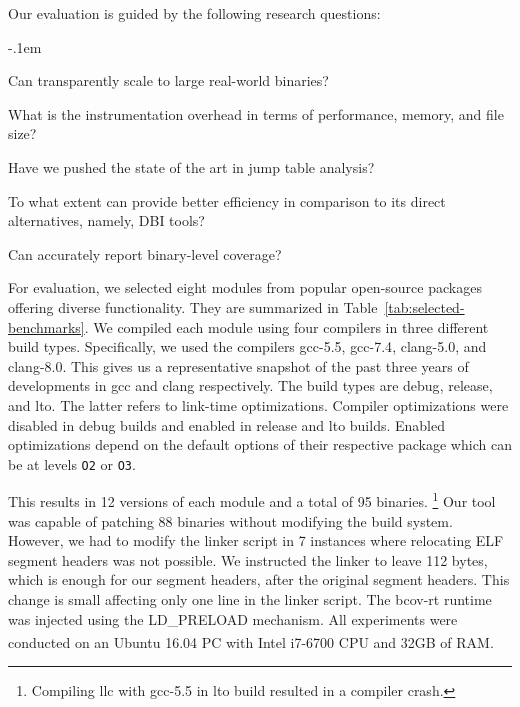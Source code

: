 Our evaluation is guided by the following research questions:

\begin{description}
    \itemsep-.1em
    \item[RQ1] Can {\bcov} transparently scale to large real-world binaries?
    \item[RQ2] What is the instrumentation overhead in terms of performance, memory, and file size?        
    \item[RQ3] Have we pushed the state of the art in jump table analysis?    
    \item[RQ4] To what extent can {\bcov} provide better efficiency in comparison to its direct alternatives, namely, DBI tools?    
    \item[RQ5] Can {\bcov} accurately report binary-level coverage?    

\end{description}

For evaluation, we selected eight modules from popular open-source packages offering diverse functionality.
They are summarized in Table~\ref{tab:selected-benchmarks}.
We compiled each module using four compilers in three different build types.
Specifically, we used the compilers \textsf{gcc-5.5}, \textsf{gcc-7.4}, \textsf{clang-5.0}, and \textsf{clang-8.0}.
This gives us a representative snapshot of the past three years of developments in \textsf{gcc} and \textsf{clang} respectively.
The build types are \textsf{debug}, \textsf{release}, and \textsf{lto}.
The latter refers to link-time optimizations.
Compiler optimizations were disabled in \textsf{debug} builds and enabled in \textsf{release} and \textsf{lto} builds.
Enabled optimizations depend on the default options of their respective package which can  be at levels \texttt{O2} or \texttt{O3}.



This results in 12 versions of each module and a total of 95 binaries.
\footnote{Compiling \textsf{llc} with \textsf{gcc-5.5} in \textsf{lto} build resulted in a compiler crash.}
Our tool was capable of patching 88 binaries without modifying the build system.
However, we had to modify the linker script in 7 instances where relocating ELF segment headers was not possible. 
We instructed the linker to leave 112 bytes, which is enough for our segment headers, after the original segment headers.
This change is small affecting only one line in the linker script.
The \mbox{\textsf{bcov-rt}} runtime was injected using the LD\_PRELOAD mechanism.
All experiments were conducted on an Ubuntu 16.04 PC with Intel\textsuperscript{\textregistered} i7-6700 CPU and 32GB of RAM.


